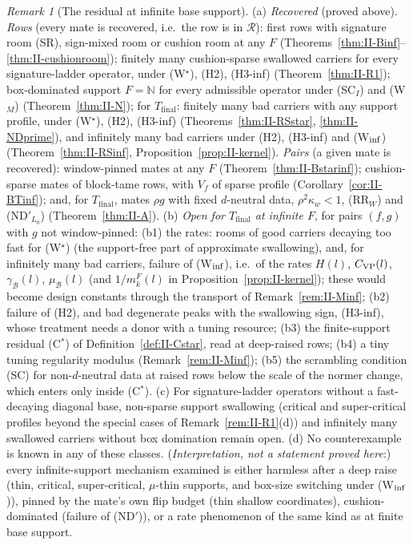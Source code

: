 \documentclass[10pt]{amsart}
\theoremstyle{definition}
\theoremstyle{remark}
\newtheorem{remark}[theorem]{Remark}
\newcommand{\N}{\mathbb N}
\newcommand{\Rec}{\mathcal R}
\begin{document}
\begin{remark}[The residual at infinite base support]\label{rem:II-residualinf}
(a) \emph{Recovered} (proved above).  \emph{Rows} (every mate is
recovered, i.e.\ the row is in $\Rec$): first rows with signature room (SR),
sign-mixed room or cushion room at any $F$
(Theorems~\ref{thm:II-Binf}--\ref{thm:II-cushionroom}); finitely many
cushion-sparse swallowed carriers for every signature-ladder operator, under
(W$^\star$), (H2), (H3-inf) (Theorem~\ref{thm:II-R1}); box-dominated support
$F=\N$ for every admissible operator under (SC$_I$) and (W$_M$)
(Theorem~\ref{thm:II-N}); for $T_{\mathrm{final}}$: finitely many bad carriers
with any support profile, under (W$^\star$), (H2), (H3-inf)
(Theorems~\ref{thm:II-RSstar}, \ref{thm:II-NDprime}), and infinitely many bad
carriers under (H2), (H3-inf) and (W$_{\rm inf}$) (Theorem~\ref{thm:II-RSinf},
Proposition~\ref{prop:II-kernel}).  \emph{Pairs} (a given mate is recovered):
window-pinned mates at any $F$ (Theorem~\ref{thm:II-Bstarinf}); cushion-sparse
mates of block-tame rows, with $V_f$ of sparse profile
(Corollary~\ref{cor:II-BTinf}); and, for $T_{\mathrm{final}}$, mates $\rho g$
with fixed $d$-neutral data, $\rho^2\kappa_w<1$, (RR$_W$) and (ND$'_{L_0}$)
(Theorem~\ref{thm:II-A}).
(b) \emph{Open for $T_{\mathrm{final}}$ at infinite $F$}, for pairs $(f,g)$
with $g$ not window-pinned: (b1) the rates: rooms of good carriers decaying
too fast for (W$^\star$) (the support-free part of approximate swallowing),
and, for infinitely many bad carriers, failure of (W$_{\rm inf}$), i.e.\ of the
rates $H(l)$, $C_{\rm VP}(l)$, $\gamma_{\mathcal B}(l)$, $\mu_{\mathcal B}(l)$
(and $1/m^F_k(l)$ in Proposition~\ref{prop:II-kernel}); these would become
design constants through the transport of Remark~\ref{rem:II-Minf}; (b2) failure
of (H2), and bad degenerate peaks with the swallowing sign, (H3-inf), whose
treatment needs a donor with a tuning resource; (b3) the finite-support
residual (C$^*$) of Definition~\ref{def:II-Cstar}, read at deep-raised rows; (b4)
a tiny tuning regularity modulus (Remark~\ref{rem:II-Minf}); (b5) the scrambling
condition (SC) for non-$d$-neutral data at raised rows below the scale of the
normer change, which enters only inside (C$^*$).
(c) For signature-ladder operators without a fast-decaying diagonal base,
non-sparse support swallowing (critical and super-critical profiles beyond the
special cases of Remark~\ref{rem:II-R1}(d)) and infinitely many swallowed
carriers without box domination remain open.
(d) No counterexample is known in any of these classes.  (\emph{Interpretation,
not a statement proved here}:) every infinite-support
mechanism examined is either harmless after a deep raise (thin, critical,
super-critical, $\mu$-thin supports, and box-size switching under
(W$_{\rm inf}$)), pinned by the mate's
own flip budget (thin shallow coordinates), cushion-dominated (failure of
(ND$'$)), or a rate phenomenon of the same kind as at finite base support.
\end{remark}
\end{document}
